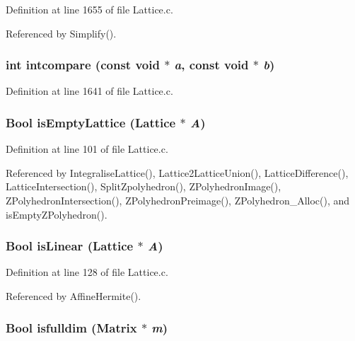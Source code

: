 Definition at line 1655 of file Lattice.c.

Referenced by Simplify().

\subsubsection{\setlength{\rightskip}{0pt plus 5cm}int intcompare (const void $\ast$ {\em a}, const void $\ast$ {\em b})}\label{Lattice_8c_a37}




Definition at line 1641 of file Lattice.c.
\subsubsection{\setlength{\rightskip}{0pt plus 5cm}Bool is\-Empty\-Lattice (Lattice $\ast$ {\em A})}\label{Lattice_8c_a6}




Definition at line 101 of file Lattice.c.

Referenced by Integralise\-Lattice(), Lattice2Lattice\-Union(), Lattice\-Difference(), Lattice\-Intersection(), Split\-Zpolyhedron(), ZPolyhedron\-Image(), ZPolyhedron\-Intersection(), ZPolyhedron\-Preimage(), ZPolyhedron\_\-Alloc(), and is\-Empty\-ZPolyhedron().

\subsubsection{\setlength{\rightskip}{0pt plus 5cm}Bool is\-Linear (Lattice $\ast$ {\em A})}\label{Lattice_8c_a7}




Definition at line 128 of file Lattice.c.

Referenced by Affine\-Hermite().

\subsubsection{\setlength{\rightskip}{0pt plus 5cm}Bool isfulldim (Matrix $\ast$ {\em m})}\label{Lattice_8c_a27}




